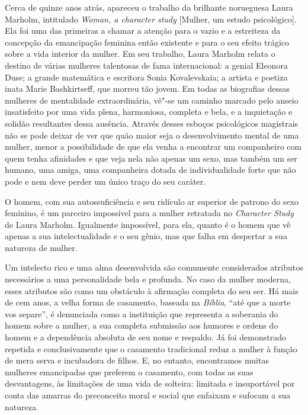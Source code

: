 Cerca de quinze anos atrás, apareceu o trabalho da brilhante norueguesa
Laura Marholm, intitulado \emph{Woman, a character study}
{[}Mulher, um estudo psicológico{]}. Ela foi uma das primeiras a
chamar a atenção para o vazio e a estreiteza da concepção da emancipação
feminina então existente e para o seu efeito trágico sobre a vida
interior da mulher. Em seu trabalho, Laura Marholm relata o destino de
várias mulheres talentosas de fama internacional: a genial Eleonora
Duse; a grande matemática e escritora Sonia Kovalevskaia; a artista e
poetiza inata Marie Bashkirtseff, que morreu tão jovem. Em todas as
biografias dessas mulheres de mentalidade extraordinária, vê"-se um
caminho marcado pelo anseio insatisfeito por uma vida plena, harmoniosa,
completa e bela, e a inquietação e solidão resultantes dessa ausência.
Através desses esboços psicológicos magistrais não se pode deixar de ver
que quão maior seja o desenvolvimento mental de uma mulher, menor a
possibilidade de que ela venha a encontrar um companheiro com quem tenha
afinidades e que veja nela não apenas um sexo, mas também um ser humano,
uma amiga, uma companheira dotada de individualidade forte que não pode
e nem deve perder um único traço do seu caráter.

O homem, com sua autossuficiência e seu ridículo ar superior de
patrono do sexo feminino, é um parceiro impossível para a mulher
retratada no \emph{Character Study} de Laura Marholm. Igualmente impossível, para ela, quanto é o homem que vê apenas a sua intelectualidade e o seu
gênio, mas que falha em despertar a sua natureza de mulher.

Um intelecto rico e uma alma desenvolvida são comumente considerados
atributos necessários a uma personalidade bela e profunda. No caso da
mulher moderna, esses atributos são como um obstáculo à afirmação
completa do seu ser. Há mais de cem anos, a velha forma de casamento,
baseada na \emph{Bíblia}, ``até que a morte vos separe'', é denunciada
como a instituição que representa a soberania do homem sobre a mulher, a
sua completa submissão aos humores e ordens do homem e a dependência
absoluta de seu nome e respaldo. Já foi demonstrado repetida e
conclusivamente que o casamento tradicional reduz a mulher à função
de mera serva e incubadora de filhos. E, no entanto, encontramos muitas
mulheres emancipadas que preferem o casamento, com todas as suas
desvantagens, às limitações de uma vida de solteira: limitada e
insuportável por conta das amarras do preconceito moral e social que
enfaixam e sufocam a sua natureza.

